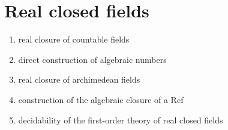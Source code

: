 \chapter{Real closed fields}

\begin{enumerate}
\item real closure of countable fields
\item direct construction of algebraic numbers
\item real closure of archimedean fields
\item construction of the algebraic closure of a Rcf
\item decidability of the first-order theory of real closed fields
\end{enumerate}


